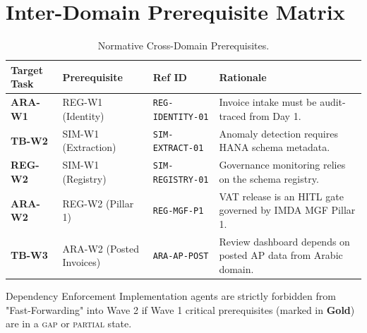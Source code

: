 \documentclass[11pt,a4paper,twoside]{report}
\begin{document}
\section{Inter-Domain Prerequisite Matrix}

\begin{table}[htbp]
\centering
\footnotesize
\caption{Normative Cross-Domain Prerequisites.}
\label{tab:prerequisites}
\begin{tabularx}{\textwidth}{@{}l l l X@{}}
\toprule
\textbf{Target Task} & \textbf{Prerequisite} & \textbf{Ref ID} & \textbf{Rationale} \\
\midrule
\rowcolor{sapmidnight!5}
\textbf{ARA-W1} & REG-W1 (Identity) & \texttt{REG-IDENTITY-01} & Invoice intake must be audit-traced from Day 1. \\
\textbf{TB-W2}  & SIM-W1 (Extraction) & \texttt{SIM-EXTRACT-01} & Anomaly detection requires HANA schema metadata. \\
\rowcolor{sapmidnight!5}
\textbf{REG-W2} & SIM-W1 (Registry) & \texttt{SIM-REGISTRY-01} & Governance monitoring relies on the schema registry. \\
\textbf{ARA-W2} & REG-W2 (Pillar 1) & \texttt{REG-MGF-P1} & VAT release is an HITL gate governed by IMDA MGF Pillar 1. \\
\rowcolor{sapmidnight!5}
\textbf{TB-W3}  & ARA-W2 (Posted Invoices) & \texttt{ARA-AP-POST} & Review dashboard depends on posted AP data from Arabic domain. \\
\bottomrule
\end{tabularx}
\end{table}

\begin{adrbox}{Dependency Enforcement}
Implementation agents are strictly forbidden from "Fast-Forwarding" into Wave 2 if Wave 1 critical prerequisites (marked in \textcolor{sapamber}{\textbf{Gold}}) are in a \textsc{gap} or \textsc{partial} state.
\end{adrbox}
\end{document}
